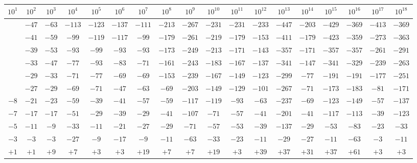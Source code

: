 \documentclass[10pt, portrait,letterpaper]{article}
\begin{document}
{\scriptsize
\begin{center}
\begin{tabular}{|c|c|c|c|c|c|c|c|c|c|c|c|c|c|c|c|c|c|}
		\hline
	$10^{1}$ & $10^{2}$ & $10^{3}$ & $10^{4}$ & $10^{5}$ & $10^{6}$ & $10^{7}$ & $10^{8}$ & $10^{9}$ & $10^{10}$ & $10^{11}$ & $10^{12}$ & $10^{13}$ & $10^{14}$ & $10^{15}$ & $10^{16}$ & $10^{17}$ & $10^{18}$ \\
		\hline
	 & $-47$ & $-63$ & $-113$ & $-123$ & $-137$ & $-111$ & $-213$ & $-267$ & $-231$ & $-231$ & $-233$ & $-447$ & $-203$ & $-429$ & $-369$ & $-413$ & $-369$ \\
		\hline
	 & $-41$ & $-59$ & $-99$ & $-119$ & $-117$ & $-99$ & $-179$ & $-261$ & $-219$ & $-179$ & $-153$ & $-411$ & $-179$ & $-423$ & $-359$ & $-273$ & $-363$ \\
		\hline
	 & $-39$ & $-53$ & $-93$ & $-99$ & $-93$ & $-93$ & $-173$ & $-249$ & $-213$ & $-171$ & $-143$ & $-357$ & $-171$ & $-357$ & $-357$ & $-261$ & $-291$ \\
		\hline
	 & $-33$ & $-47$ & $-77$ & $-93$ & $-83$ & $-71$ & $-161$ & $-243$ & $-183$ & $-167$ & $-137$ & $-341$ & $-147$ & $-341$ & $-329$ & $-239$ & $-263$ \\
		\hline
	 & $-29$ & $-33$ & $-71$ & $-77$ & $-69$ & $-69$ & $-153$ & $-239$ & $-167$ & $-149$ & $-123$ & $-299$ & $-77$ & $-191$ & $-191$ & $-177$ & $-251$ \\
		\hline
	 & $-27$ & $-29$ & $-69$ & $-71$ & $-47$ & $-63$ & $-69$ & $-203$ & $-149$ & $-129$ & $-101$ & $-267$ & $-71$ & $-173$ & $-183$ & $-81$ & $-171$ \\
		\hline
	$-8$ & $-21$ & $-23$ & $-59$ & $-39$ & $-41$ & $-57$ & $-59$ & $-117$ & $-119$ & $-93$ & $-63$ & $-237$ & $-69$ & $-123$ & $-149$ & $-57$ & $-137$ \\
		\hline
	$-7$ & $-17$ & $-17$ & $-51$ & $-29$ & $-39$ & $-29$ & $-41$ & $-107$ & $-71$ & $-57$ & $-41$ & $-201$ & $-41$ & $-117$ & $-113$ & $-39$ & $-123$ \\
		\hline
	$-5$ & $-11$ & $-9$ & $-33$ & $-11$ & $-21$ & $-27$ & $-29$ & $-71$ & $-57$ & $-53$ & $-39$ & $-137$ & $-29$ & $-53$ & $-83$ & $-23$ & $-33$ \\
		\hline
	$-3$ & $-3$ & $-3$ & $-27$ & $-9$ & $-17$ & $-9$ & $-11$ & $-63$ & $-33$ & $-23$ & $-11$ & $-29$ & $-27$ & $-11$ & $-63$ & $-3$ & $-11$ \\
		\hline\hline
	$+1$ & $+1$ & $+9$ & $+7$ & $+3$ & $+3$ & $+19$ & $+7$ & $+7$ & $+19$ & $+3$ & $+39$ & $+37$ & $+31$ & $+37$ & $+61$ & $+3$ & $+3$ \\

\end{tabular}
\end{center}}
\end{document}
